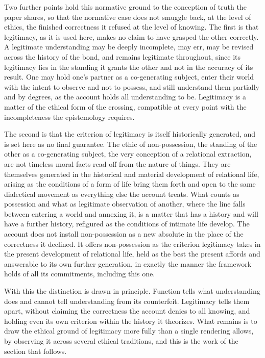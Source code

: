 Two further points hold this normative ground to the conception of truth the paper shares, so that the normative case does not smuggle back, at the level of ethics, the finished correctness it refused at the level of knowing. The first is that legitimacy, as it is used here, makes no claim to have grasped the other correctly. A legitimate understanding may be deeply incomplete, may err, may be revised across the history of the bond, and remains legitimate throughout, since its legitimacy lies in the standing it grants the other and not in the accuracy of its result. One may hold one's partner as a co-generating subject, enter their world with the intent to observe and not to possess, and still understand them partially and by degrees, as the account holds all understanding to be. Legitimacy is a matter of the ethical form of the crossing, compatible at every point with the incompleteness the epistemology requires.

The second is that the criterion of legitimacy is itself historically generated, and is set here as no final guarantee. The ethic of non-possession, the standing of the other as a co-generating subject, the very conception of a relational extraction, are not timeless moral facts read off from the nature of things. They are themselves generated in the historical and material development of relational life, arising as the conditions of a form of life bring them forth and open to the same dialectical movement as everything else the account treats. What counts as possession and what as legitimate observation of another, where the line falls between entering a world and annexing it, is a matter that has a history and will have a further history, refigured as the conditions of intimate life develop. The account does not install non-possession as a new absolute in the place of the correctness it declined. It offers non-possession as the criterion legitimacy takes in the present development of relational life, held as the best the present affords and answerable to its own further generation, in exactly the manner the framework holds of all its commitments, including this one.

With this the distinction is drawn in principle. Function tells what understanding does and cannot tell understanding from its counterfeit. Legitimacy tells them apart, without claiming the correctness the account denies to all knowing, and holding even its own criterion within the history it theorizes. What remains is to draw the ethical ground of legitimacy more fully than a single rendering allows, by observing it across several ethical traditions, and this is the work of the section that follows.

